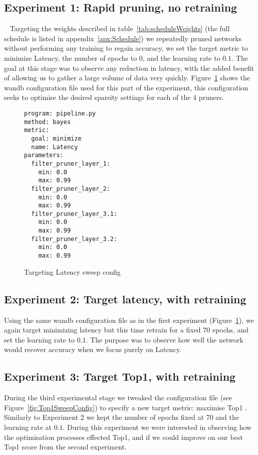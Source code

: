 \documentclass[../Dissertation.tex]{subfiles}
\begin{document}
\subsection{Experiment 1: Rapid pruning, no retraining}~\label{sec:ex1}
Targeting the weights described in table~\ref{tab:scheduleWeights} (the full schedule is listed in appendix~\ref{apx:Schedule}) we repeatedly pruned networks without performing any training to regain accuracy, we set the target metric to minimize Latency, the number of epochs to $0$, and the learning rate to $0.1$.
The goal at this stage was to observe any reduction in latency, with the added benefit of allowing us to gather a large volume of data very quickly.
Figure~\ref{fig:LatencySweepConfig} shows the \acrshort{wandb} configuration file used for this part of the experiment, this configuration seeks to optimise the desired sparsity settings for each of the 4 pruners.

\singlespacing
\begin{figure}[H]
    \centering
    \begin{verbatim}
program: pipeline.py
method: bayes
metric:
  goal: minimize
  name: Latency
parameters:
  filter_pruner_layer_1:
    min: 0.0
    max: 0.99
  filter_pruner_layer_2:
    min: 0.0
    max: 0.99
  filter_pruner_layer_3.1:
    min: 0.0
    max: 0.99
  filter_pruner_layer_3.2:
    min: 0.0
    max: 0.99
    \end{verbatim}
    \caption{Targeting Latency sweep config}
    \label{fig:LatencySweepConfig}
\end{figure}
\doublespacing

\subsection{Experiment 2: Target latency, with retraining}

Using the same \acrshort{wandb} configuration file as in the first experiment (Figure~\ref{fig:LatencySweepConfig}), we again target minimizing latency but this time retrain for a fixed $70$ epochs, and set the learning rate to $0.1$.
The purpose was to observe how well the network would recover accuracy when we focus purely on Latency.

\subsection{Experiment 3: Target Top1, with retraining}
During the third experimental stage we tweaked the configuration file (see Figure~\ref{fig:Top1SweepConfig}) to specify a new target metric: maximise Top1 .
Similarly to Experiment 2 we kept the number of epochs fixed at $70$ and the learning rate at $0.1$.
During this experiment we were interested in observing how the optimisation processes effected Top1, and if we could improve on our best Top1 score from the second experiment.
\end{document}
